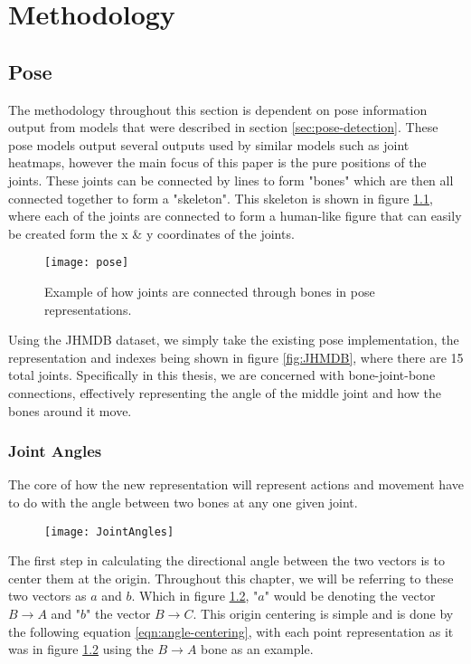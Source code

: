 
\chapter{Methodology}

\label{Methodology}

\section{Pose}

The methodology throughout this section is dependent on pose information output from models that were described in section \ref{sec:pose-detection}. These pose models output several outputs used by similar models such as joint heatmaps, however the main focus of this paper is the pure positions of the joints. These joints can be connected by lines to form "bones" which are then all connected together to form a "skeleton". This skeleton is shown in figure \ref{fig:pose}, where each of the joints are connected to form a human-like figure that can easily be created form the x \& y coordinates of the joints.

\begin{figure}[ht]
	\texttt{[image: pose]}
	\centering
	\caption{Example of how joints are connected through bones in pose representations.}
	\label{fig:pose}
\end{figure}

Using the JHMDB dataset, we simply take the existing pose implementation, the representation and indexes being shown in figure \ref{fig:JHMDB}, where there are 15 total joints. Specifically in this thesis, we are concerned with bone-joint-bone connections, effectively representing the angle of the middle joint and how the bones around it move.

\subsection{Joint Angles}

The core of how the new representation will represent actions and movement have to do with the angle between two bones at any one given joint.

\begin{figure}[ht]
	\texttt{[image: JointAngles]}
	\centering
	\caption{}
	\label{fig:joint-angles}
\end{figure}

The first step in calculating the directional angle between the two vectors is to center them at the origin. Throughout this chapter, we will be referring to these two vectors as $a$ and $b$. Which in figure \ref{fig:joint-angles}, "$a$" would be denoting the vector $B \rightarrow A$ and "$b$" the vector $B \rightarrow C$. This origin centering is simple and is done by the following equation \ref{eqn:angle-centering}, with each point representation as it was in figure \ref{fig:joint-angles} using the $B \rightarrow A$ bone as an example.

